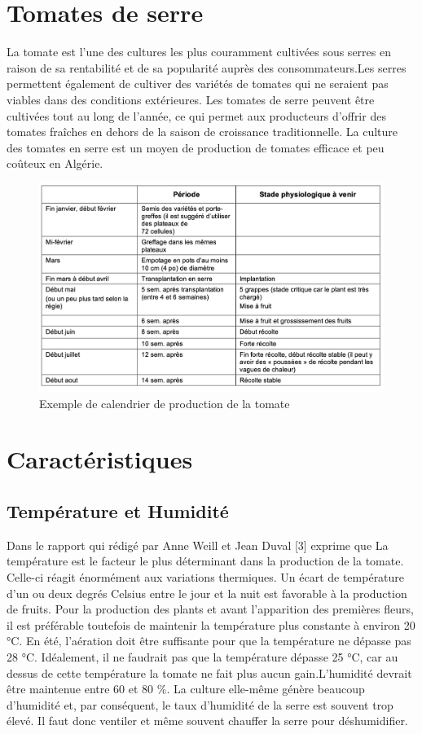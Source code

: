 \section{Tomates de serre }
La tomate est l'une des cultures les plus couramment cultivées sous serres en raison de sa rentabilité et de sa popularité auprès des consommateurs.Les serres permettent également de cultiver des variétés de tomates qui ne seraient pas viables dans des conditions extérieures. Les tomates de serre peuvent être cultivées tout au long de l'année, ce qui permet aux producteurs d'offrir des tomates fraîches en dehors de la saison de croissance traditionnelle.
La culture des tomates en serre est un moyen de production de tomates efficace et peu
coûteux en Algérie.
\begin{figure}
    \centering
    \label{fig:Exemple de calendrier de production de la tomate} 
    \caption{Exemple de calendrier de production de la tomate}
	\includegraphics[width=15cm]{figures/periodetomate.png}
	
\end{figure}

\section{Caractéristiques}

\subsection{Température et Humidité}
Dans le rapport qui rédigé par Anne Weill et Jean Duval [3] exprime que 
La température est le facteur le plus déterminant dans la production de la tomate. Celle-ci
réagit énormément aux variations thermiques.
Un écart de température d’un ou deux degrés Celsius entre le jour et la nuit est favorable à
la production de fruits. Pour la production des plants et avant l’apparition des premières
fleurs, il est préférable toutefois de maintenir la température plus constante à environ
20 °C. En été, l’aération doit être suffisante pour que la température ne dépasse pas 28
°C. Idéalement, il ne faudrait pas que la température dépasse  25 °C, car au dessus de cette température la tomate ne fait plus aucun gain.L’humidité  devrait être
maintenue entre 60 et 80 \%. La culture elle-même génère beaucoup d’humidité et, par
conséquent, le taux d’humidité de la serre est souvent trop élevé. Il faut donc ventiler et
même souvent chauffer la serre pour déshumidifier.



